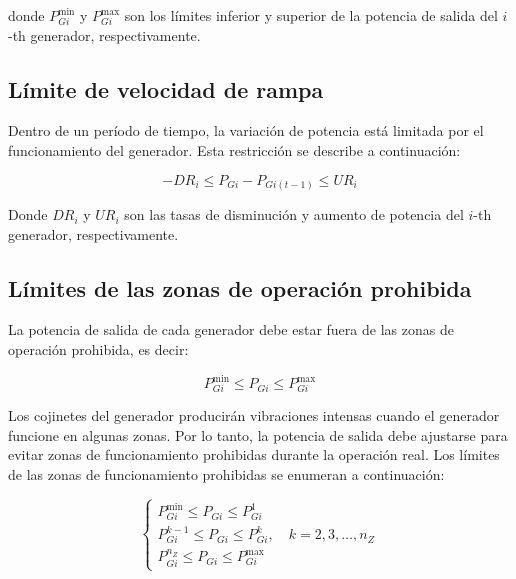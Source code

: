\documentclass[11pt]{article}
\begin{document}
donde \( P_{Gi}^{\min} \) y \( P_{Gi}^{\max} \) son los límites inferior y superior de la potencia de salida del 
\( i \)-th generador, respectivamente.

\subsection{Límite de velocidad de rampa}


Dentro de un período de tiempo, la variación de potencia está limitada por el funcionamiento del generador. 
Esta restricción se describe a continuación:

\begin{equation}
    - DR_{i} \leq  P_{Gi} - P_{Gi(t-1)} \leq UR_{i}
\end{equation}

Donde \( DR_{i} \) y \( UR_{i} \) son las tasas de disminución y aumento de potencia del \( i \)-th generador,
respectivamente.

\subsection{Límites de las zonas de operación prohibida}

La potencia de salida de cada generador debe estar fuera de las zonas de operación prohibida, es decir:

\begin{equation}
    P_{Gi}^{\min} \leq P_{Gi} \leq P_{Gi}^{\max}
\end{equation}

Los cojinetes del generador producirán vibraciones intensas cuando el generador funcione en algunas
zonas. Por lo tanto, la potencia de salida debe ajustarse para evitar zonas de funcionamiento prohibidas durante
la operación real. Los límites de las zonas de funcionamiento prohibidas se enumeran a continuación:

\begin{equation}
    \left\{
    \begin{array}{l}
        P_{Gi}^{\min} \leq P_{Gi} \leq P_{Gi}^{1} \\[8pt]
        P_{Gi}^{k-1} \leq P_{Gi} \leq P_{Gi}^{k}, \quad k = 2,3,\dots,n_Z \\[8pt]
        P_{Gi}^{n_Z} \leq P_{Gi} \leq P_{Gi}^{\max}
    \end{array}
    \right.
\end{equation}
\end{document}
